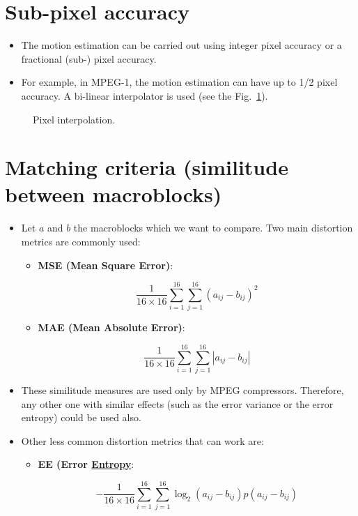 \section{Sub-pixel accuracy}

\begin{itemize}
\tightlist
\item
  The motion estimation can be carried out using integer pixel accuracy
  or a fractional (sub-) pixel accuracy.
\item
  For example, in MPEG-1, the motion estimation can have up to 1/2
  pixel accuracy. A bi-linear interpolator is used (see the
  Fig.~\ref{fig:interpolation}).
\end{itemize}

\begin{figure}
  \caption{Pixel interpolation.}
  \label{fig:interpolation}
\end{figure}

\section{Matching criteria (similitude between macroblocks)}
\begin{itemize}
\item
  Let $a$ and $b$ the macroblocks which we want to compare. Two main
  distortion metrics are commonly used:

  \begin{itemize}
  \item
    \textbf{MSE (Mean Square Error)}:

    \begin{equation}
      \frac{1}{16\times 16}\sum_{i=1}^{16}\sum_{j=1}^{16}(a_{ij}-b_{ij})^2
    \end{equation}
  \item
    \textbf{MAE (Mean Absolute Error)}:

    \begin{equation}
      \frac{1}{16\times 16}\sum_{i=1}^{16}\sum_{j=1}^{16}|a_{ij}-b_{ij}|
    \end{equation}
  \end{itemize}
\item
  These similitude measures are used only by MPEG compressors.
  Therefore, any other one with similar effects (such as the error
  variance or the error entropy) could be used also.
\item
  Other less common distortion metrics that can work are:

  \begin{itemize}
  \item
    \textbf{EE (Error
    \href{https://en.wikipedia.org/wiki/Entropy_(information_theory)}{Entropy}}:

    \begin{equation}
      -\frac{1}{16\times 16}\sum_{i=1}^{16}\sum_{j=1}^{16}\log_2(a_{ij}-b_{ij})p(a_{ij}-b_{ij})
    \end{equation}
  \end{itemize}
\end{itemize}

